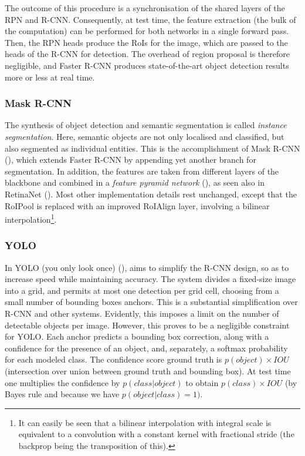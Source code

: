 The outcome of this procedure is a synchronisation of the shared layers of the RPN and R-CNN. Consequently, at test time, the feature extraction (the bulk of the computation) can be performed for both networks in a single forward pass. Then, the RPN heads produce the RoIs for the image, which are passed to the heads of the R-CNN for detection. The overhead of region proposal is therefore negligible, and Faster R-CNN produces state-of-the-art object detection results more or less at real time.

\subsubsection{Mask R-CNN}

The synthesis of object detection and semantic segmentation is called \emph{instance segmentation}. Here, semantic objects are not only localised and classified, but also segmented as individual entities. This is the accomplishment of Mask R-CNN (\cite{he2017mask}), which extends Faster R-CNN by appending yet another branch for segmentation. In addition, the features are taken from different layers of the blackbone and combined in a \emph{feature pyramid network} (\cite{lin2017feature}), as seen also in RetinaNet (\cite{lin2017focal}). Most other implementation details rest unchanged, except that the RoIPool is replaced with an improved RoIAlign layer, involving a bilinear interpolation\footnote{It can easily be seen that a bilinear interpolation with integral scale is equivalent to a convolution with a constant kernel with fractional stride (the backprop being the transposition of this).}.


\subsubsection{YOLO}

In YOLO (you only look once) (\cite{redmon2016you}), aims to simplify the R-CNN design, so as to increase speed while maintaining accuracy. The system divides a fixed-size image into a grid, and permits at most one detection per grid cell, choosing from a small number of bounding boxes anchors. This is a substantial simplification over R-CNN and other systems. Evidently, this imposes a limit on the number of detectable objects per image. However, this proves to be a negligible constraint for YOLO. Each anchor predicts a bounding box correction, along with a confidence for the presence of an object, and, separately, a softmax probability for each modeled class. The confidence score ground truth is $p(object) \times IOU$ (intersection over union between ground truth and bounding box). At test time one multiplies the confidence by $p(class|object)$ to obtain $p(class) \times IOU$ (by Bayes rule and because we have $p(object|class) = 1)$.

